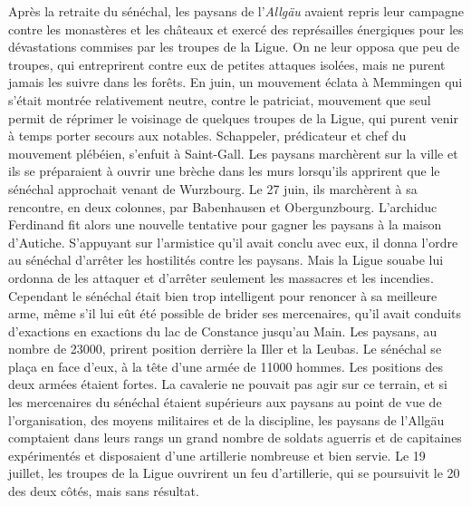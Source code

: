 \documentclass[french,twoside]{book} %
\begin{document}
Après la retraite du sénéchal, les paysans de l’\emph{Allgäu} avaient repris leur campagne contre les monastères et les châteaux et exercé des représailles énergiques pour les dévastations commises par les troupes de la Ligue. On ne leur opposa que peu de troupes, qui entreprirent contre eux de petites attaques isolées, mais ne purent jamais les suivre dans les forêts. En juin, un mouvement éclata à Memmingen qui s’était montrée relativement neutre, contre le patriciat, mouvement que seul permit de réprimer le voisinage de quelques troupes de la Ligue, qui purent venir à temps porter secours aux notables. Schappeler, prédicateur et chef du mouvement plébéien, s’enfuit à Saint-Gall. Les paysans marchèrent sur la ville et ils se préparaient à ouvrir une brèche dans les murs lorsqu’ils apprirent que le sénéchal approchait venant de Wurzbourg. Le 27 juin, ils marchèrent à sa rencontre, en deux colonnes, par Babenhausen et Obergunzbourg. L’archiduc Ferdinand fit alors une nouvelle tentative pour gagner les paysans à la maison d’Autiche. S’appuyant sur l’armistice qu’il avait conclu avec eux, il donna l’ordre au sénéchal d’arrêter les hostilités contre les paysans. Mais la Ligue souabe lui ordonna de les attaquer et d’arrêter seulement les massacres et les incendies. Cependant le sénéchal était bien trop intelligent pour renoncer à sa meilleure arme, même s’il lui eût été possible de brider ses mercenaires, qu’il avait conduits d’exactions en exactions du lac de Constance jusqu’au Main. Les paysans, au nombre de 23000, prirent position derrière la Iller et la Leubas. Le sénéchal se plaça en face d’eux, à la tête d’une armée de 11000 hommes. Les positions des deux armées étaient fortes. La cavalerie ne pouvait pas agir sur ce terrain, et si les mercenaires du sénéchal étaient supérieurs aux paysans au point de vue de l’organisation, des moyens militaires et de la discipline, les paysans de l’Allgäu comptaient dans leurs rangs un grand nombre de soldats aguerris et de capitaines expérimentés et disposaient d’une artillerie nombreuse et bien servie. Le 19 juillet, les troupes de la Ligue ouvrirent un feu d’artillerie, qui se poursuivit le 20 des deux côtés, mais sans résultat.\par
\end{document}
